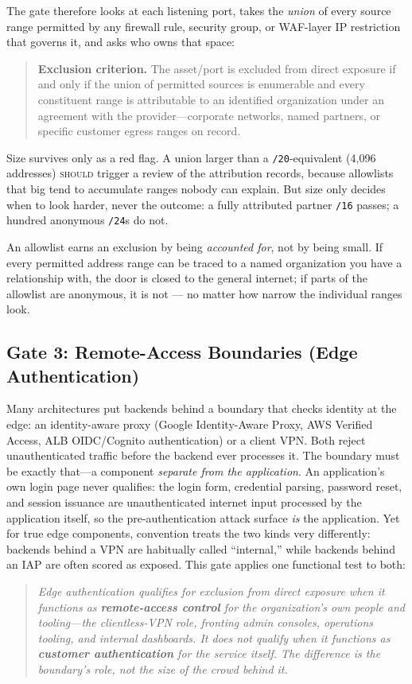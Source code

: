 \documentclass[11pt]{article}
\newcommand{\code}[1]{\texttt{#1}}
\newcommand{\rfckw}[1]{\textsc{#1}}
\begin{document}
The gate therefore looks at each listening port, takes the \emph{union} of every source range permitted by any firewall rule, security group, or WAF-layer IP restriction that governs it, and asks who owns that space:
\begin{quote}
\textbf{Exclusion criterion.} The asset/port is excluded from direct exposure if and only if the union of permitted sources is enumerable and every constituent range is attributable to an identified organization under an agreement with the provider---corporate networks, named partners, or specific customer egress ranges on record.
\end{quote}
Size survives only as a red flag. A union larger than a \code{/20}-equivalent (4{,}096 addresses) \rfckw{should} trigger a review of the attribution records, because allowlists that big tend to accumulate ranges nobody can explain. But size only decides when to look harder, never the outcome: a fully attributed partner \code{/16} passes; a hundred anonymous \code{/24}s do not.

\begin{plain}
An allowlist earns an exclusion by being \emph{accounted for}, not by being small. If every permitted address range can be traced to a named organization you have a relationship with, the door is closed to the general internet; if parts of the allowlist are anonymous, it is not --- no matter how narrow the individual ranges look.
\end{plain}

\subsection{Gate 3: Remote-Access Boundaries (Edge Authentication)}
\label{sec:gate3}
Many architectures put backends behind a boundary that checks identity at the edge: an identity-aware proxy (Google Identity-Aware Proxy, AWS Verified Access, ALB OIDC/Cognito authentication) or a client VPN. Both reject unauthenticated traffic before the backend ever processes it. The boundary must be exactly that---a component \emph{separate from the application}. An application's own login page never qualifies: the login form, credential parsing, password reset, and session issuance are unauthenticated internet input processed by the application itself, so the pre-authentication attack surface \emph{is} the application. Yet for true edge components, convention treats the two kinds very differently: backends behind a VPN are habitually called ``internal,'' while backends behind an IAP are often scored as exposed. This gate applies one functional test to both:
\begin{quote}
\emph{Edge authentication qualifies for exclusion from direct exposure when it functions as \textbf{remote-access control} for the organization's own people and tooling---the clientless-VPN role, fronting admin consoles, operations tooling, and internal dashboards. It does not qualify when it functions as \textbf{customer authentication} for the service itself. The difference is the boundary's role, not the size of the crowd behind it.}
\end{quote}
\end{document}
